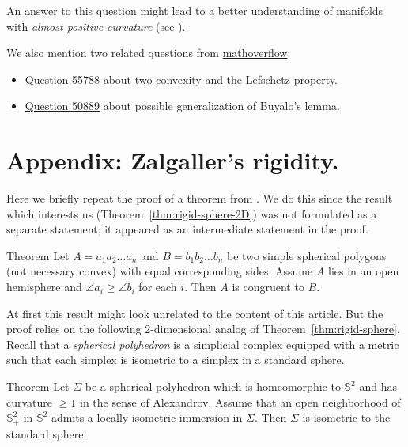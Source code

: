 \documentclass[oneside,a4paper]{article}
\begin{document}
An answer to this question might lead to a better understanding of manifolds with \emph{almost positive curvature} (see \cite{ziller}).

\medskip

We also mention two related questions from \href{http://mathoverflow.net/}{mathoverflow}:
\begin{itemize}
 \item \href{http://mathoverflow.net/questions/55788}{Question 55788}
about two-convexity and the Lefschetz property.
\item \href{http://mathoverflow.net/questions/50889}{Question  50889}
about possible generalization of Buyalo's lemma.
\end{itemize}


\def\claim#1{\par\medskip\noindent\refstepcounter{thm}\hbox{\bf \Alph{section}.\arabic{thm}. #1.}
\it\ %
}

\appendix
\setcounter{section}{1}
\setcounter{thm}{0}
\section*{Appendix: Zalgaller's rigidity.}\label{subsec:zalgaller}
Here we briefly repeat the proof of a theorem from \cite{zalgaller}.
We do this since the result which interests us (Theorem~\ref{thm:rigid-sphere-2D}) was not formulated as a separate statement;
it appeared as an intermediate statement in the proof.

\begin{thm}{Theorem}\label{thm:zalgaller}
Let $A=a_1a_2\dots a_n$ and $B=b_1b_2\dots b_n$ be two simple spherical polygons (not necessary convex)
with equal corresponding sides.
Assume $A$ lies in an open hemisphere and $\angle a_i\ge\angle b_i$ for each $i$.
Then $A$ is congruent to $B$.

\end{thm}

At first this result might look unrelated to the content of this article.
But the proof relies on the following 2-dimensional analog of Theorem~\ref{thm:rigid-sphere}.
Recall that a \emph{spherical polyhedron} is a simplicial complex equipped with a metric such that each simplex is isometric to a simplex in a standard sphere.

\begin{thm}{Theorem}\label{thm:rigid-sphere-2D}
Let $\Sigma$ be a spherical polyhedron which is homeomorphic to $\mathbb S^2$ and has curvature $\ge 1$ in the sense of Alexandrov. Assume that an open neighborhood of $\mathbb S^2_+$ in $\mathbb S^2$
admits a locally isometric immersion in $\Sigma$.
Then $\Sigma$ is isometric to the standard sphere.
\end{thm}
\end{document}
